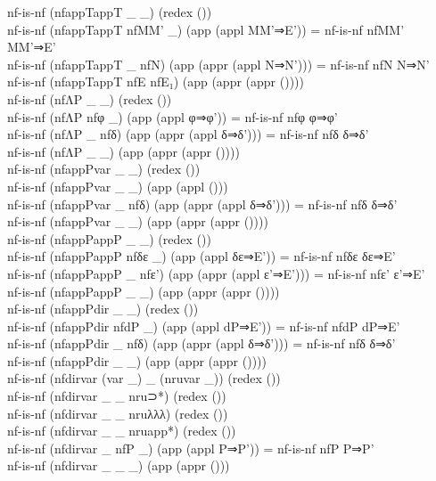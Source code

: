 {\begin{code}
{\>nf-is-nf (nfappTappT \_ \_) (redex ())\<\\
\>nf-is-nf (nfappTappT nfMM' \_) (app (appl MM'⇒E')) = nf-is-nf nfMM' MM'⇒E'\<\\
\>nf-is-nf (nfappTappT \_ nfN) (app (appr (appl N⇒N'))) = nf-is-nf nfN N⇒N'\<\\
\>nf-is-nf (nfappTappT nfE nfE₁) (app (appr (appr ())))\<\\
\>nf-is-nf (nfΛP \_ \_) (redex ())\<\\
\>nf-is-nf (nfΛP nfφ \_) (app (appl φ⇒φ')) = nf-is-nf nfφ φ⇒φ'\<\\
\>nf-is-nf (nfΛP \_ nfδ) (app (appr (appl δ⇒δ'))) = nf-is-nf nfδ δ⇒δ'\<\\
\>nf-is-nf (nfΛP \_ \_) (app (appr (appr ())))\<\\
\>nf-is-nf (nfappPvar \_ \_) (redex ())\<\\
\>nf-is-nf (nfappPvar \_ \_) (app (appl ()))\<\\
\>nf-is-nf (nfappPvar \_ nfδ) (app (appr (appl δ⇒δ'))) = nf-is-nf nfδ δ⇒δ'\<\\
\>nf-is-nf (nfappPvar \_ \_) (app (appr (appr ())))\<\\
\>nf-is-nf (nfappPappP \_ \_) (redex ())\<\\
\>nf-is-nf (nfappPappP nfδε \_) (app (appl δε⇒E')) = nf-is-nf nfδε δε⇒E'\<\\
\>nf-is-nf (nfappPappP \_ nfε') (app (appr (appl ε'⇒E'))) = nf-is-nf nfε' ε'⇒E'\<\\
\>nf-is-nf (nfappPappP \_ \_) (app (appr (appr ())))\<\\
\>nf-is-nf (nfappPdir \_ \_) (redex ())\<\\
\>nf-is-nf (nfappPdir nfdP \_) (app (appl dP⇒E')) = nf-is-nf nfdP dP⇒E'\<\\
\>nf-is-nf (nfappPdir \_ nfδ) (app (appr (appl δ⇒δ'))) = nf-is-nf nfδ δ⇒δ'\<\\
\>nf-is-nf (nfappPdir \_ \_) (app (appr (appr ())))\<\\
\>nf-is-nf (nfdirvar (var \_) \_ (nruvar \_)) (redex ())\<\\
\>nf-is-nf (nfdirvar \_ \_ nru⊃*) (redex ())\<\\
\>nf-is-nf (nfdirvar \_ \_ nruλλλ) (redex ())\<\\
\>nf-is-nf (nfdirvar \_ \_ nruapp*) (redex ())\<\\
\>nf-is-nf (nfdirvar \_ nfP \_) (app (appl P⇒P')) = nf-is-nf nfP P⇒P'\<\\
\>nf-is-nf (nfdirvar \_ \_ \_) (app (appr ()))\<\\
}
\end{code}}
